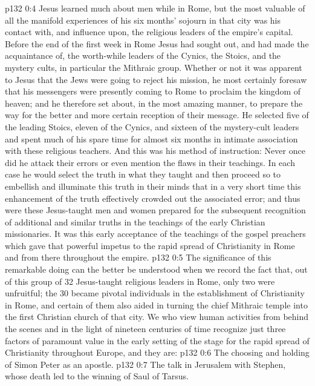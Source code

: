 \vs p132 0:4 Jesus learned much about men while in Rome, but the most valuable of all the manifold experiences of his six months’ sojourn in that city was his contact with, and influence upon, the religious leaders of the empire’s capital. Before the end of the first week in Rome Jesus had sought out, and had made the acquaintance of, the worth\hyp{}while leaders of the Cynics, the Stoics, and the mystery cults, in particular the Mithraic group. Whether or not it was apparent to Jesus that the Jews were going to reject his mission, he most certainly foresaw that his messengers were presently coming to Rome to proclaim the kingdom of heaven; and he therefore set about, in the most amazing manner, to prepare the way for the better and more certain reception of their message. He selected five of the leading Stoics, eleven of the Cynics, and sixteen of the mystery\hyp{}cult leaders and spent much of his spare time for almost six months in intimate association with these religious teachers. And this was his method of instruction: Never once did he attack their errors or even mention the flaws in their teachings. In each case he would select the truth in what they taught and then proceed so to embellish and illuminate this truth in their minds that in a very short time this enhancement of the truth effectively crowded out the associated error; and thus were these Jesus\hyp{}taught men and women prepared for the subsequent recognition of additional and similar truths in the teachings of the early Christian missionaries. It was this early acceptance of the teachings of the gospel preachers which gave that powerful impetus to the rapid spread of Christianity in Rome and from there throughout the empire.
\vs p132 0:5 The significance of this remarkable doing can the better be understood when we record the fact that, out of this group of 32 Jesus\hyp{}taught religious leaders in Rome, only two were unfruitful; the 30 became pivotal individuals in the establishment of Christianity in Rome, and certain of them also aided in turning the chief Mithraic temple into the first Christian church of that city. We who view human activities from behind the scenes and in the light of nineteen centuries of time recognize just three factors of paramount value in the early setting of the stage for the rapid spread of Christianity throughout Europe, and they are:
\vs p132 0:6 \bibnobreakspace The choosing and holding of Simon Peter as an apostle.
\vs p132 0:7 \bibnobreakspace The talk in Jerusalem with Stephen, whose death led to the winning of Saul of Tarsus.
